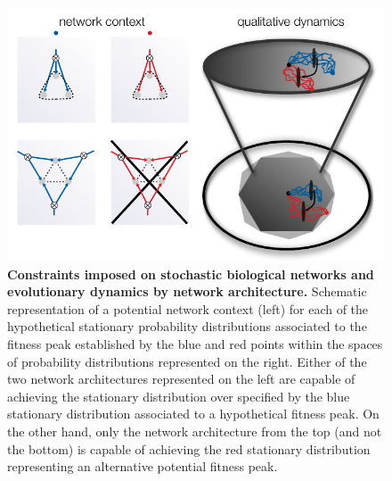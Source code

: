 \begin{figure}[!ht]
\centering
\noindent\includegraphics[width=0.9\columnwidth]{fig/stochdynscheme.pdf}
\caption{{\bf Constraints imposed on stochastic biological networks and evolutionary dynamics by network architecture.} Schematic representation of a potential network context (left) for each of the hypothetical stationary probability distributions associated to the fitness peak established by the blue and red points within the spaces of probability distributions represented on the right.
Either of the two network architectures represented on the left are capable of achieving the stationary distribution over \gnpm{} specified by the blue stationary distribution associated to a hypothetical fitness peak. On the other hand, only the network architecture from the top (and not the bottom) is capable of achieving the red stationary distribution representing an alternative potential fitness peak.}
\label{fig:stochdynscheme}
\end{figure}
